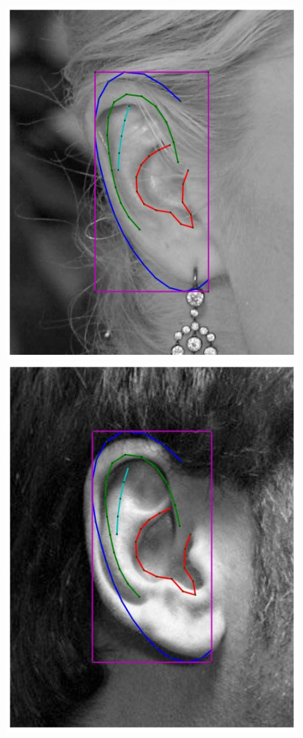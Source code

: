 \begin{figure}
    \centering
    \newcommand{\flowh}{0.275\columnwidth}
    \includegraphics[height=\flowh]{resources/Ear_Deformable_Model/fittings/initial_0000}
    \hfill
    \includegraphics[height=\flowh]{resources/Ear_Deformable_Model/fittings/initial_0001}

\end{figure}
